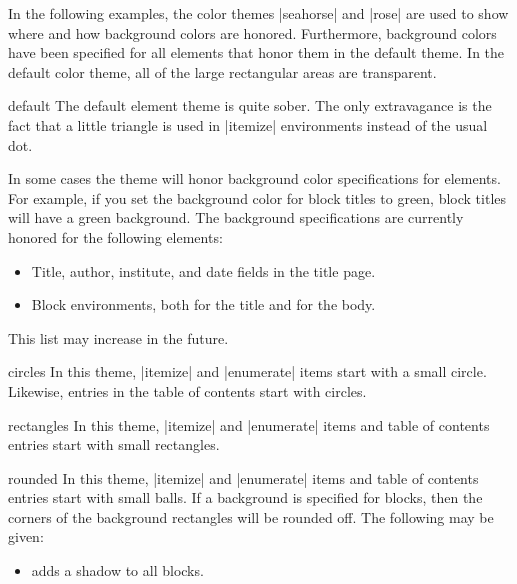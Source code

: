 In the following examples, the color themes |seahorse| and |rose| are used to show where and how background colors are honored. Furthermore, background colors have been specified for all elements that honor them in the default theme. In the default color theme, all of the large rectangular areas are transparent.

\begin{innerthemeexample}{default}
  The default element theme is quite sober. The only extravagance is the fact that a little triangle is used in |itemize| environments instead of the usual dot.

  In some cases the theme will honor background color specifications for elements. For example, if you set the background color for block titles to green, block titles will have a green background. The background specifications are currently honored for the following elements:
  \begin{itemize}
  \item Title, author, institute, and date fields in the title page.
  \item Block environments, both for the title and for the body.
  \end{itemize}
  This list may increase in the future.
\end{innerthemeexample}

\begin{innerthemeexample}{circles}
  In this theme, |itemize| and |enumerate| items start with a small circle. Likewise, entries in the table of contents start with circles.
\end{innerthemeexample}

\begin{innerthemeexample}{rectangles}
  In this theme, |itemize| and |enumerate| items and table of contents entries start with small rectangles.
\end{innerthemeexample}

\begin{innerthemeexample}{rounded}
  In this theme, |itemize| and |enumerate| items and table of contents entries start with small balls. If a background is specified for blocks, then the corners of the background rectangles will be rounded off. The following  may be given:

  \begin{itemize}
  \item {} adds a shadow to all blocks.
  \end{itemize}
\end{innerthemeexample}

